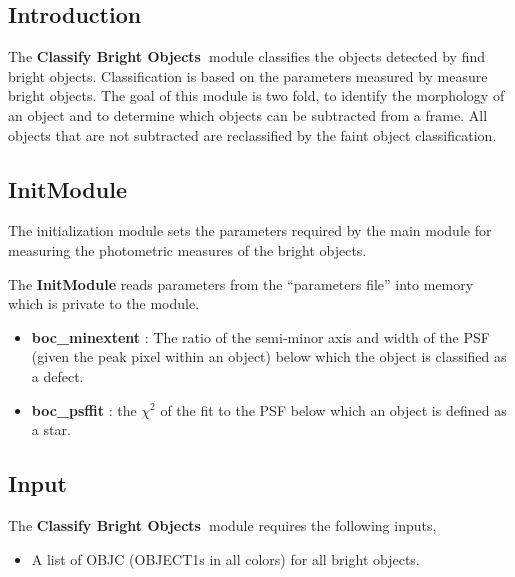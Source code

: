 \def \bom{{\bf Classify Bright Objects\ }}       
 
\subsection {Introduction}
 
The \bom module classifies the objects detected by find bright objects.
Classification is based on the parameters measured by measure bright objects.
The goal of this module is two fold, to identify the morphology of
an object and to determine which objects can be subtracted from a frame.
All objects that are not subtracted are reclassified by the faint
object classification.
 
\subsection {InitModule}
 
The initialization module sets the parameters required by the main
module for measuring the photometric measures of the bright objects. 
 
The {\bf InitModule} reads parameters from the ``parameters file''
into memory which is private to the module.  
 
\begin{itemize}
 
  \item {\bf boc\_minextent} : The ratio of the semi-minor axis and 
  width of the PSF (given the peak pixel within an object) below which
  the object is classified as a defect.
 
  \item {\bf boc\_psffit} : the $\chi^2$ of the fit to the PSF below which
  an object is defined as a star.
 
\end{itemize}
 
\subsection{Input}
 
The \bom module requires the following inputs,
 
\begin{itemize}
 
\item A list of OBJC (OBJECT1s in all colors) for all bright objects.
 
\end{itemize}
 

